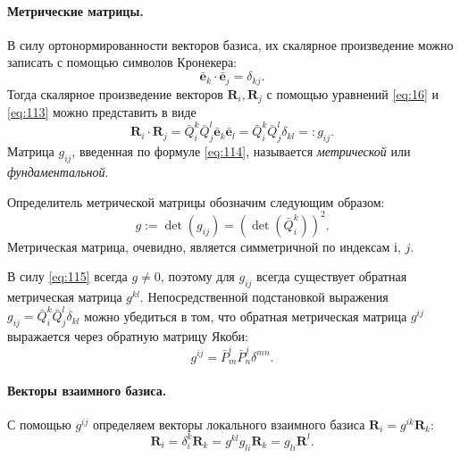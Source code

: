 \paragraph{Метрические матрицы.}
В силу ортонормированности векторов базиса, их скалярное произведение можно
записать с помощью символов Кронекера:
\begin{equation}
\label{eq:113}
    \bar{\textbf{e}}_k \cdot \bar{\textbf{e}}_j = \delta_{kj}.
\end{equation}
Тогда скалярное произведение векторов $\textbf{R}_i, \textbf{R}_j$ с помощью
уравнений \eqref{eq:16} и \eqref{eq:113}  можно представить в виде
\begin{equation}
\label{eq:114}
    \textbf{R}_i\cdot \textbf{R}_j = 
    \bar{Q}^k_i \bar{Q}^l_j \bar{\textbf{e}}_k \bar{\textbf{e}}_l =
    \bar{Q}^k_i \bar{Q}^l_j \delta_{kl} =:
    g_{ij}.
\end{equation}
 Матрица $g_{ij}$, введенная по формуле \eqref{eq:114}, называется
 \emph{метрической} или \emph{фундаментальной}.

Определитель метрической матрицы обозначим следующим образом:
\begin{equation}
\label{eq:115}
    g := \det(g_{ij}) = (\det(\bar{Q}^k_i))^2.
\end{equation}
Метрическая матрица, очевидно, является симметричной по индексам $і$, $j$.

В силу \eqref{eq:115} всегда $g \ne 0$, поэтому для $g_{ij}$ всегда существует
обратная метрическая матрица $g^{kl}$.
Непосредственной подстановкой выражения $g_{ij} = \bar{Q}^k_i \bar{Q}^l_j
\delta_{kl}$  можно убедиться в том, что обратная метрическая
матрица $g^{ij}$ выражается через обратную матрицу Якоби:
\begin{equation}
\label{eq:118}
    g^{ij} = \bar{P}^i_m \bar{P}^j_n \delta^{mn}.
\end{equation}

\paragraph{Векторы взаимного базиса.}
 С помощью $g^{ij}$ определяем векторы локального взаимного базиса $\textbf{R}_i
 =g^{ik}\textbf{R}_k$:
\begin{equation}
\label{eq:119}
    \textbf{R}_i = \delta^k_i\textbf{R}_k =
    g^{kl}g_{li}\textbf{R}_k = g_{li}\textbf{R}^l.
\end{equation}

